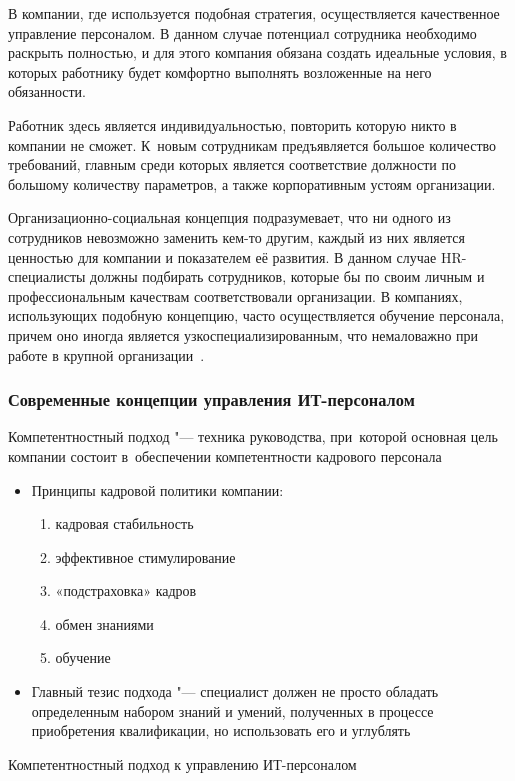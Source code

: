 \documentclass{../industrial-development}
\begin{document}
В компании, где используется подобная стратегия, осуществляется качественное управление персоналом. В данном случае потенциал сотрудника необходимо раскрыть полностью, и для этого компания обязана создать идеальные условия, в которых работнику будет комфортно выполнять возложенные на него обязанности.

Работник здесь является индивидуальностью, повторить которую никто в компании не сможет. К~новым сотрудникам предъявляется большое количество требований, главным среди которых является соответствие должности по большому количеству параметров, а также корпоративным устоям организации. 

Организационно-социальная концепция подразумевает, что ни одного из сотрудников невозможно заменить кем-то другим, каждый из них является ценностью для компании и показателем её развития. В данном случае HR-специалисты должны подбирать сотрудников, которые бы по своим личным и профессиональным качествам соответствовали организации. В компаниях, использующих подобную концепцию, часто осуществляется обучение персонала, причем оно иногда является узкоспециализированным, что немаловажно при работе в крупной организации~\cite{Sovrconcept}. 

\begin{frame} \frametitle{Современные концепции управления ИТ-персоналом}
	\alert{Компетентностный подход} "---  техника руководства, при~которой основная цель компании состоит в~обеспечении компетентности кадрового персонала 
 \begin{itemize}
\item Принципы кадровой политики компании: 
	 \begin{enumerate}
	\item кадровая стабильность
	\item эффективное стимулирование
	\item «подстраховка» кадров
	\item обмен знаниями
	\item обучение
	 \end{enumerate}
	\item Главный тезис подхода "--- специалист должен не просто обладать определенным набором знаний и умений, полученных в процессе приобретения квалификации, но использовать его и углублять 
  \end{itemize}
\end{frame}

\lecturenotes

\alert{Компетентностный подход к управлению ИТ-персоналом}
\end{document}
